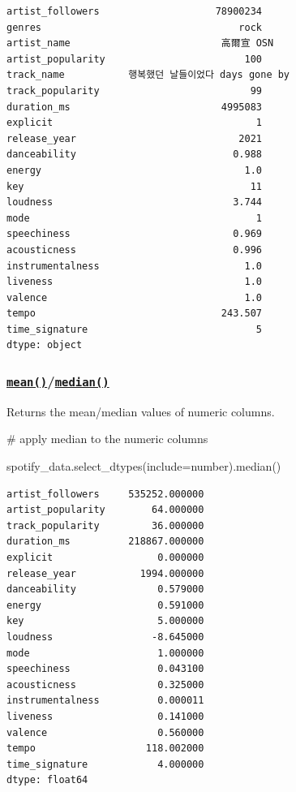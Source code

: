 \documentclass[
  letterpaper,
  DIV=11,
  numbers=noendperiod]{scrreprt}
\newenvironment{Shaded}{\begin{snugshade}}{\end{snugshade}}
\newcommand{\CommentTok}[1]{\textcolor[rgb]{0.37,0.37,0.37}{#1}}
\newcommand{\NormalTok}[1]{\textcolor[rgb]{0.00,0.23,0.31}{#1}}
\newcommand{\OperatorTok}[1]{\textcolor[rgb]{0.37,0.37,0.37}{#1}}
\newcommand{\StringTok}[1]{\textcolor[rgb]{0.13,0.47,0.30}{#1}}
\begin{document}
\begin{verbatim}
artist_followers                    78900234
genres                                  rock
artist_name                          高爾宣 OSN
artist_popularity                        100
track_name           행복했던 날들이었다 days gone by
track_popularity                          99
duration_ms                          4995083
explicit                                   1
release_year                            2021
danceability                           0.988
energy                                   1.0
key                                       11
loudness                               3.744
mode                                       1
speechiness                            0.969
acousticness                           0.996
instrumentalness                         1.0
liveness                                 1.0
valence                                  1.0
tempo                                243.507
time_signature                             5
dtype: object
\end{verbatim}

\hypertarget{meanmedian}{%
\subsubsection{\texorpdfstring{\href{https://pandas.pydata.org/docs/reference/api/pandas.DataFrame.mean.html}{\texttt{mean()}}/\href{https://pandas.pydata.org/docs/reference/api/pandas.DataFrame.median.html}{\texttt{median()}}}{mean()/median()}}\label{meanmedian}}

Returns the mean/median values of numeric columns.

\begin{Shaded}
\begin{Highlighting}[]
\CommentTok{\# apply median to the numeric columns}

\NormalTok{spotify\_data.select\_dtypes(include}\OperatorTok{=}\StringTok{\textquotesingle{}number\textquotesingle{}}\NormalTok{).median()}
\end{Highlighting}
\end{Shaded}

\begin{verbatim}
artist_followers     535252.000000
artist_popularity        64.000000
track_popularity         36.000000
duration_ms          218867.000000
explicit                  0.000000
release_year           1994.000000
danceability              0.579000
energy                    0.591000
key                       5.000000
loudness                 -8.645000
mode                      1.000000
speechiness               0.043100
acousticness              0.325000
instrumentalness          0.000011
liveness                  0.141000
valence                   0.560000
tempo                   118.002000
time_signature            4.000000
dtype: float64
\end{verbatim}
\end{document}
